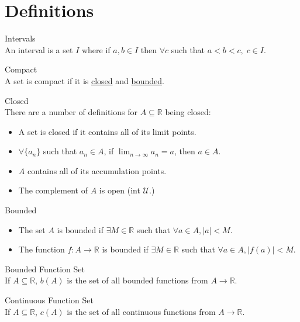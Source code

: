 \documentclass{article}
\begin{document}
\section{Definitions}
\begin{description}
\item Intervals \label{interval}\hfill \\
	An interval is a set \(I\) where if \(a,b\in I\) then \(\forall c\) such that \(a<b<c,\; c\in I\).

\item Compact \label{compact}\hfill \\
	A set is compact if it is \hyperref[closed]{closed} and \hyperref[bounded]{bounded}.
	
\item Closed \label{closed}\hfill \\
There are a number of definitions for \(A\subseteq \mathbb{R}\) being closed:
\begin{itemize}
\item A set is closed if it contains all of its limit points.
\item \(\forall \{a_n\} \) such that \(a_n \in A\), if \(\lim_{n\to\infty}a_n=a\), then \(a\in A.\)
\item \(A\) contains all of its accumulation points.
\item The complement of \(A\) is open (int \(\mathcal{U}\).)
\end{itemize}

\item Bounded \label{bounded}\hfill \\
\begin{itemize}
\item The set \(A\) is bounded if \(\exists M\in\mathbb{R}\) such that \(\forall a\in A, |a|<M.\)
\item The function \(f:A\to \mathbb{R}\) is bounded if \(\exists M\in\mathbb{R}\) such that \(\forall a\in A, |f(a)|<M.\)
\end{itemize}

\item Bounded Function Set \label{setofboundedfunctions}\hfill \\
If \(A\subseteq\mathbb{R}\), \(b(A)\) is the set of all bounded functions from \(A\to\mathbb{R}\).

\item Continuous Function Set \label{setofcontinuousfunctions}\hfill \\
If \(A\subseteq\mathbb{R}\), \(c(A)\) is the set of all continuous functions from \(A\to\mathbb{R}\).


\end{description}
\end{document}
